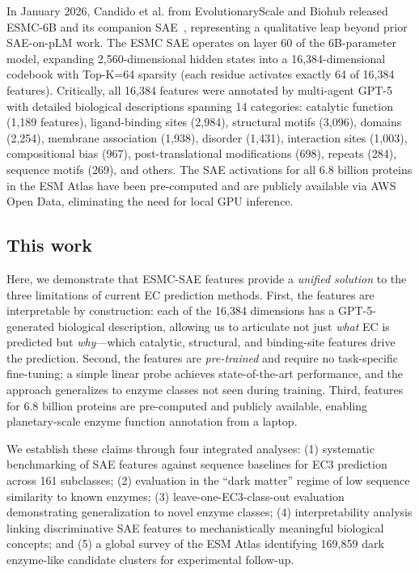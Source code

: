 \documentclass[12pt,a4paper]{article}
\begin{document}
In January 2026, Candido et al. from EvolutionaryScale and Biohub released ESMC-6B and its companion SAE~\cite{candido2026language}, representing a qualitative leap beyond prior SAE-on-pLM work. The ESMC SAE operates on layer 60 of the 6B-parameter model, expanding 2,560-dimensional hidden states into a 16,384-dimensional codebook with Top-K=64 sparsity (each residue activates exactly 64 of 16,384 features). Critically, all 16,384 features were annotated by multi-agent GPT-5 with detailed biological descriptions spanning 14 categories: catalytic function (1,189 features), ligand-binding sites (2,984), structural motifs (3,096), domains (2,254), membrane association (1,938), disorder (1,431), interaction sites (1,003), compositional bias (967), post-translational modifications (698), repeats (284), sequence motifs (269), and others. The SAE activations for all 6.8 billion proteins in the ESM Atlas have been pre-computed and are publicly available via AWS Open Data, eliminating the need for local GPU inference.

\subsection{This work}

Here, we demonstrate that ESMC-SAE features provide a \textit{unified solution} to the three limitations of current EC prediction methods. First, the features are interpretable by construction: each of the 16,384 dimensions has a GPT-5-generated biological description, allowing us to articulate not just \textit{what} EC is predicted but \textit{why}---which catalytic, structural, and binding-site features drive the prediction. Second, the features are \textit{pre-trained} and require no task-specific fine-tuning; a simple linear probe achieves state-of-the-art performance, and the approach generalizes to enzyme classes not seen during training. Third, features for 6.8 billion proteins are pre-computed and publicly available, enabling planetary-scale enzyme function annotation from a laptop.

We establish these claims through four integrated analyses: (1) systematic benchmarking of SAE features against sequence baselines for EC3 prediction across 161 subclasses; (2) evaluation in the ``dark matter'' regime of low sequence similarity to known enzymes; (3) leave-one-EC3-class-out evaluation demonstrating generalization to novel enzyme classes; (4) interpretability analysis linking discriminative SAE features to mechanistically meaningful biological concepts; and (5) a global survey of the ESM Atlas identifying 169,859 dark enzyme-like candidate clusters for experimental follow-up.
\end{document}
